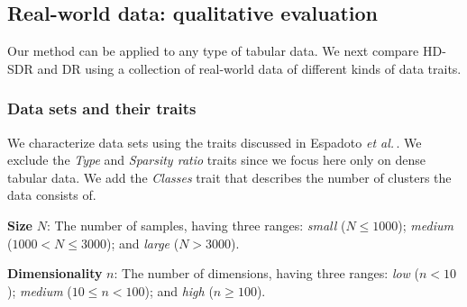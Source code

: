 \documentclass[sagev,Afour,times]{sagej}
\begin{document}
\subsection{Real-world data: qualitative evaluation}
\label{sec:results:realworld}
%
Our method can be applied to any type of tabular data. We next compare HD-SDR and DR using a collection of real-world data of different kinds of data traits.

\begin{table*}[!htbp]
\tiny
\centering
 \caption{Trait values for real-world data sets}
 \label{table:traits}
\end{table*}

\subsubsection{Data sets and their traits}
\label{sec:data_traits}
%
We characterize data sets using the traits discussed in Espadoto \emph{et al.}\,\cite{mateusDR_survey2019}. We exclude the \emph{Type} and \emph{Sparsity ratio} traits since we focus here only on dense tabular data. We add the \emph{Classes} trait
that describes the number of clusters the data consists of.

\noindent\textbf{Size} $N$: The number of samples, having three ranges: \emph{small} ($N \leq 1000$); \emph{medium} ($1000 < N \leq 3000$); and \emph{large} ($N > 3000$).

\noindent\textbf{Dimensionality} $n$: The number of dimensions, having three ranges: \emph{low} ($n < 10$); \emph{medium} ($10 \leq n < 100$); and \emph{high} ($n \geq 100$).
\end{document}
